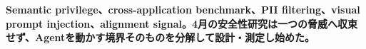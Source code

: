 \noindent\textbf{Semantic privilege、cross-application benchmark、PII filtering、visual prompt injection、alignment signal。4月の安全性研究は一つの脅威へ収束せず、Agentを動かす境界そのものを分解して設計・測定し始めた。}\autocite{src-2f8952da2dc3,src-3efc4342b784,src-477d406be59c,src-73ae4b975e7b,src-8cf1b0dc8361,src-a408165af133}
